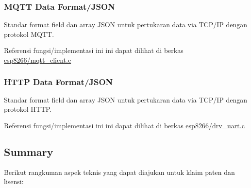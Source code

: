 \documentclass[12pt,]{article}
\begin{document}
	\subsubsection{MQTT Data Format/JSON}
	
	Standar format field dan array JSON untuk pertukaran data via TCP/IP dengan protokol MQTT.
	
	Referensi fungsi/implementasi ini ini dapat dilihat di berkas
	\href{https://github.com/VibrasticLab/pikoakustik/blob/stm32f401re_3pin/esp8266/user/mqtt\_client.c}{esp8266/mqtt\_client.c}
	
	\subsubsection{HTTP Data Format/JSON}
	
	Standar format field dan array JSON untuk pertukaran data via TCP/IP dengan protokol HTTP.
	
	Referensi fungsi/implementasi ini ini dapat dilihat di berkas
	\href{https://github.com/VibrasticLab/pikoakustik/blob/stm32f401re_3pin/esp8266/user/drv\_uart.c}{esp8266/drv\_uart.c}
	
	\newpage
	\subsection{Summary}
	
	Berikut rangkuman aspek teknis yang dapat diajukan untuk klaim paten dan lisensi:
	
\end{document}
